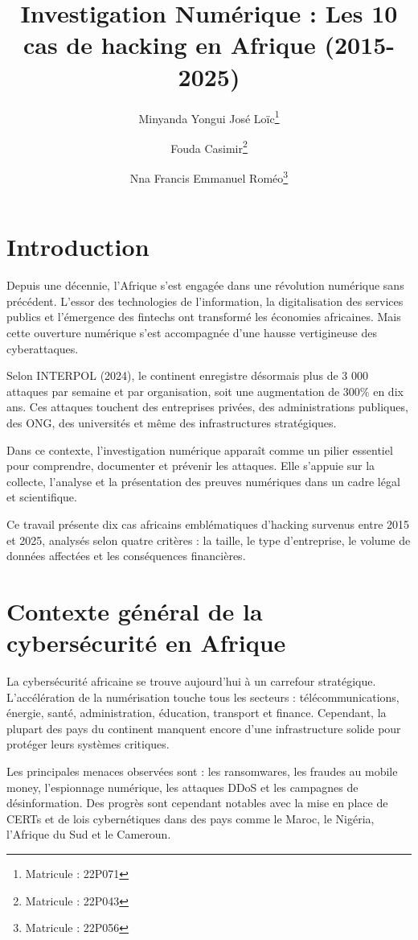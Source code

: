 \documentclass[12pt,a4paper]{article}
\title{\textbf{Investigation Numérique : Les 10 cas de hacking en Afrique (2015-2025)}}
\author{%
Minyanda Yongui José Loïc\thanks{Matricule : 22P071} \and
Fouda Casimir\thanks{Matricule : 22P043} \and
Nna Francis Emmanuel Roméo\thanks{Matricule : 22P056}%
}
\date{}
\begin{document}
\maketitle
\tableofcontents
\newpage

\section{Introduction}
Depuis une décennie, l’Afrique s’est engagée dans une révolution numérique sans précédent. L’essor des technologies de l’information, la digitalisation des services publics et l’émergence des fintechs ont transformé les économies africaines. Mais cette ouverture numérique s’est accompagnée d’une hausse vertigineuse des cyberattaques.

Selon INTERPOL (2024), le continent enregistre désormais plus de 3 000 attaques par semaine et par organisation, soit une augmentation de 300\% en dix ans. Ces attaques touchent des entreprises privées, des administrations publiques, des ONG, des universités et même des infrastructures stratégiques.

Dans ce contexte, l’investigation numérique apparaît comme un pilier essentiel pour comprendre, documenter et prévenir les attaques. Elle s’appuie sur la collecte, l’analyse et la présentation des preuves numériques dans un cadre légal et scientifique.

Ce travail présente dix cas africains emblématiques d’hacking survenus entre 2015 et 2025, analysés selon quatre critères : la taille, le type d’entreprise, le volume de données affectées et les conséquences financières.

\section{Contexte général de la cybersécurité en Afrique}
La cybersécurité africaine se trouve aujourd’hui à un carrefour stratégique. L’accélération de la numérisation touche tous les secteurs : télécommunications, énergie, santé, administration, éducation, transport et finance. Cependant, la plupart des pays du continent manquent encore d’une infrastructure solide pour protéger leurs systèmes critiques.

Les principales menaces observées sont : les ransomwares, les fraudes au mobile money, l’espionnage numérique, les attaques DDoS et les campagnes de désinformation. Des progrès sont cependant notables avec la mise en place de CERTs et de lois cybernétiques dans des pays comme le Maroc, le Nigéria, l’Afrique du Sud et le Cameroun.
\end{document}
